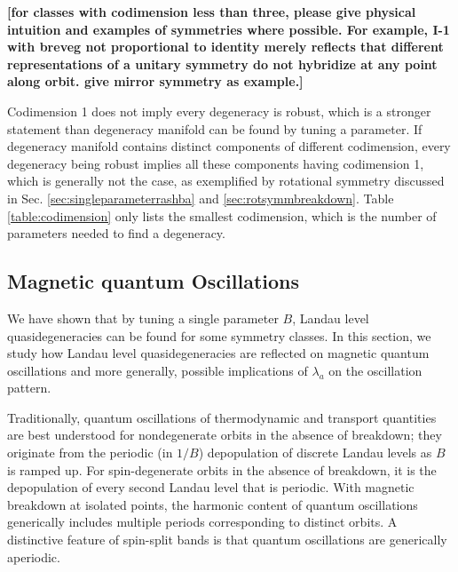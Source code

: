 \documentclass[aps, prb, showpacs, twocolumn, notitlepage, superscriptaddress]{revtex4-1}
\begin{document}
\textbf{[for classes with codimension less than three, please give physical intuition and examples of symmetries where possible. For example, I-1 with breveg not proportional to identity merely reflects that different representations of a unitary symmetry do not hybridize at any point along orbit. give mirror symmetry as example.]}

 Codimension 1 does not imply every degeneracy is robust, which is a stronger statement than degeneracy manifold can be found by tuning a parameter. If degeneracy manifold contains distinct components of different codimension, every degeneracy being robust implies all these components having codimension 1, which is generally not the case, as exemplified by rotational symmetry discussed in Sec. \ref{sec:singleparameterrashba} and \ref{sec:rotsymmbreakdown}. Table \ref{table:codimension} only lists the smallest codimension, which is the number of parameters needed to find a degeneracy. 


\subsection{Magnetic quantum Oscillations}\label{sec:qo}

We have shown that by tuning a single parameter $B$, Landau level quasidegeneracies can be found for some symmetry classes. In this section, we study how Landau level quasidegeneracies are reflected on magnetic quantum oscillations and more generally, possible implications of $\lambda_a$ on the oscillation pattern.

Traditionally, quantum oscillations of thermodynamic and transport quantities are best understood for nondegenerate orbits in the absence of breakdown; they originate from the periodic (in $1/B$) depopulation of discrete Landau levels as $B$ is ramped up. For spin-degenerate orbits in the absence of breakdown, it is the depopulation of every second Landau level that is periodic. With magnetic breakdown at isolated points, the harmonic content of quantum oscillations generically includes multiple periods corresponding to distinct orbits. A distinctive feature of spin-split bands is that quantum oscillations are generically aperiodic. 
\end{document}
